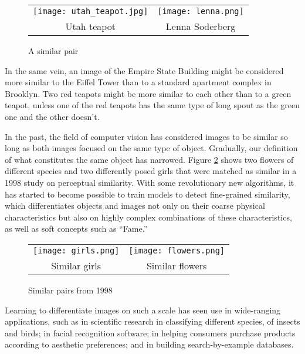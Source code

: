 \begin{figure}[!htbp]
	\centering
	\begin{tabular}{cc}
		\texttt{[image: utah\_teapot.jpg]} &
		\texttt{[image: lenna.png]}  \\
		Utah teapot & Lenna Soderberg\\[6pt]
	\end{tabular}
	\label{fig:lenna}
	\caption{A similar pair}
\end{figure}

In the same vein, an image of the Empire State Building might be considered more similar to the Eiffel Tower than to a standard apartment complex in Brooklyn. Two red teapots might be more similar to each other than to a green teapot, unless one of the red teapots has the same type of long spout as the green one and the other doesn't.

In the past, the field of computer vision has considered images to be similar so long as both images focused on the same type of object. Gradually, our definition of what constitutes the same object has narrowed. Figure \ref{fig:old_pairs} shows two flowers of different species and two differently posed girls that were matched as similar in a 1998 study on perceptual similarity.\cite{rogowitz1998perceptual} With some revolutionary new algorithms, it has started to become possible to train models to detect fine-grained similarity, which differentiates objects and images not only on their coarse physical characteristics but also on highly complex combinations of these characteristics, as well as soft concepts such as ``Fame.''

\begin{figure}[!htbp]
	\centering
	\begin{tabular}{cc}
		\texttt{[image: girls.png]} &
		\texttt{[image: flowers.png]}  \\
		Similar girls & Similar flowers \\[6pt]
	\end{tabular}
	\label{fig:old_pairs}
	\caption{Similar pairs from 1998}
\end{figure}

Learning to differentiate images on such a scale has seen use in wide-ranging applications, such as in scientific research in classifying different species, of insects and birds; in facial recognition software; in helping consumers purchase products according to aesthetic preferences; and in building search-by-example databases.\cite{krause2016unreasonable}\cite{chopra2005learning}\cite{bell2015learning}\cite{wang2014learning}

